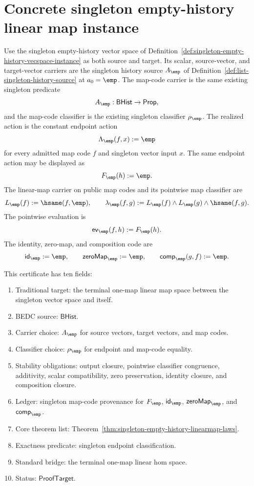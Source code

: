 \section{Concrete singleton empty-history linear map instance}
\label{sec:linearmap-concrete-singleton-instance}

\begin{definition}
\label{def:singleton-empty-history-linearmap-instance}
Use the singleton empty-history vector space of
Definition~\ref{def:singleton-empty-history-vecspace-instance} as both source
and target. Its scalar, source-vector, and target-vector carriers are the
singleton history source $A_{\emp}$ of
Definition~\ref{def:list-singleton-history-source} at $a_0=\emp$. The map-code
carrier is the same existing singleton predicate
$$
A_{\emp}:\mathsf{BHist}\to\mathsf{Prop},
$$
and the map-code classifier is the existing singleton classifier
$\rho_{\emp}$. The realized action is the constant endpoint action
$$
\Lambda_{\emp}(f,x):=\emp
$$
for every admitted map code $f$ and singleton vector input $x$. The same
endpoint action may be displayed as
$$
F_{\emp}(h):=\emp.
$$
The linear-map carrier on public map codes and its pointwise map classifier
are
$$
L_{\emp}(f):=\hsame(f,\emp),
\qquad
\lambda_{\emp}(f,g):=
L_{\emp}(f)\land L_{\emp}(g)\land\hsame(f,g).
$$
The pointwise evaluation is
$$
\mathsf{ev}_{\emp}(f,h):=F_{\emp}(h).
$$
The identity, zero-map, and composition code are
$$
\mathsf{id}_{\emp}:=\emp,\qquad
\mathsf{zeroMap}_{\emp}:=\emp,\qquad
\mathsf{comp}_{\emp}(g,f):=\emp.
$$

This certificate has ten fields:
\begin{enumerate}
  \item Traditional target: the terminal one-map linear map space between the
  singleton vector space and itself.
  \item BEDC source: $\mathsf{BHist}$.
  \item Carrier choice: $A_{\emp}$ for source vectors, target vectors, and
  map codes.
  \item Classifier choice: $\rho_{\emp}$ for endpoint and map-code equality.
  \item Stability obligations: output closure, pointwise classifier
  congruence, additivity, scalar compatibility, zero preservation, identity
  closure, and composition closure.
  \item Ledger: singleton map-code provenance for $F_{\emp}$,
  $\mathsf{id}_{\emp}$, $\mathsf{zeroMap}_{\emp}$, and
  $\mathsf{comp}_{\emp}$.
  \item Core theorem list: Theorem~\ref{thm:singleton-empty-history-linearmap-laws}.
  \item Exactness predicate: singleton endpoint classification.
  \item Standard bridge: the terminal one-map linear hom space.
  \item Status: $\mathsf{ProofTarget}$.
\end{enumerate}
\end{definition}

